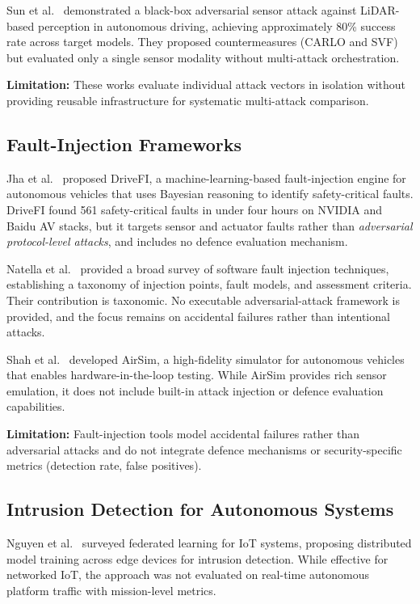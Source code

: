 Sun et al.~\cite{sun2020lidar} demonstrated a black-box adversarial sensor attack against LiDAR-based perception in autonomous driving, achieving approximately 80\% success rate across target models.
They proposed countermeasures (CARLO and SVF) but evaluated only a single sensor modality without multi-attack orchestration.

\textbf{Limitation:} These works evaluate individual attack vectors in isolation without providing reusable infrastructure for systematic multi-attack comparison.

\subsection{Fault-Injection Frameworks}

Jha et al.~\cite{jha2019drivefi} proposed DriveFI, a machine-learning-based fault-injection engine for autonomous vehicles that uses Bayesian reasoning to identify safety-critical faults.
DriveFI found 561 safety-critical faults in under four hours on NVIDIA and Baidu AV stacks, but it targets sensor and actuator faults rather than \emph{adversarial protocol-level attacks}, and includes no defence evaluation mechanism.

Natella et al.~\cite{natella2016faultinjection} provided a broad survey of software fault injection techniques, establishing a taxonomy of injection points, fault models, and assessment criteria.
Their contribution is taxonomic. No executable adversarial-attack framework is provided, and the focus remains on accidental failures rather than intentional attacks.

Shah et al.~\cite{shah2018airsim} developed AirSim, a high-fidelity simulator for autonomous vehicles that enables hardware-in-the-loop testing.
While AirSim provides rich sensor emulation, it does not include built-in attack injection or defence evaluation capabilities.

\textbf{Limitation:} Fault-injection tools model accidental failures rather than adversarial attacks and do not integrate defence mechanisms or security-specific metrics (detection rate, false positives).

\subsection{Intrusion Detection for Autonomous Systems}

Nguyen et al.~\cite{nguyen2021fliot} surveyed federated learning for IoT systems, proposing distributed model training across edge devices for intrusion detection.
While effective for networked IoT, the approach was not evaluated on real-time autonomous platform traffic with mission-level metrics.

